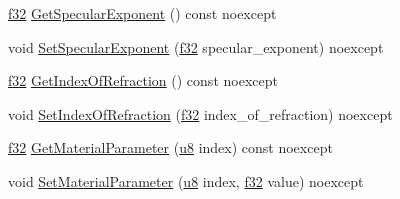 \begin{DoxyCompactItemize}
\item 
\hyperlink{namespacemage_a6a44ad388483959dc4dff9f2aef91431}{f32} \hyperlink{structmage_1_1_material_a4a4f8224baa0b8275e6b209c3799f7cd}{Get\+Specular\+Exponent} () const noexcept
\item 
void \hyperlink{structmage_1_1_material_adba6254741807b4cd8abe3a118c863d2}{Set\+Specular\+Exponent} (\hyperlink{namespacemage_a6a44ad388483959dc4dff9f2aef91431}{f32} specular\+\_\+exponent) noexcept
\item 
\hyperlink{namespacemage_a6a44ad388483959dc4dff9f2aef91431}{f32} \hyperlink{structmage_1_1_material_aebcb799be41d9c8b7fdaa4bd85bdba0b}{Get\+Index\+Of\+Refraction} () const noexcept
\item 
void \hyperlink{structmage_1_1_material_a0e8085ce5fc0d6b523d269a6d2d1f334}{Set\+Index\+Of\+Refraction} (\hyperlink{namespacemage_a6a44ad388483959dc4dff9f2aef91431}{f32} index\+\_\+of\+\_\+refraction) noexcept
\item 
\hyperlink{namespacemage_a6a44ad388483959dc4dff9f2aef91431}{f32} \hyperlink{structmage_1_1_material_a61798773153ef1d4eab7d9a75d36c050}{Get\+Material\+Parameter} (\hyperlink{namespacemage_a5a362e2d56fc439362a80516ecae7828}{u8} index) const noexcept
\item 
void \hyperlink{structmage_1_1_material_aaff5f2ae7167a28e15c5188970a05550}{Set\+Material\+Parameter} (\hyperlink{namespacemage_a5a362e2d56fc439362a80516ecae7828}{u8} index, \hyperlink{namespacemage_a6a44ad388483959dc4dff9f2aef91431}{f32} value) noexcept
\end{DoxyCompactItemize}
